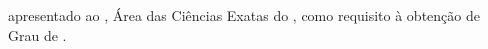 \preambulo
{
	{\imprimirprojeto} apresentado ao {\imprimircurso}, Área das Ciências Exatas do {\imprimirinstituicao}, como requisito à obtenção de Grau de {\imprimirtituloacademico}.
}